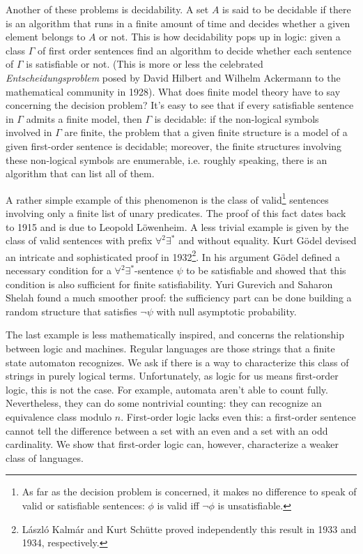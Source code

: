 Another of these problems is decidability. 
A set $A$ is said to be decidable if there is an algorithm that runs in a finite amount of time and decides whether a given element belongs to $A$ or not. 
This is how decidability pops up in logic: given a class $\Gamma$ of first order sentences find an algorithm to decide whether each sentence of $\Gamma$ is satisfiable or not. 
(This is more or less the celebrated \emph{Entscheidungsproblem} posed by David Hilbert and Wilhelm Ackermann to the mathematical community in 1928). 
What does finite model theory have to say concerning the decision problem? 
It's easy to see that if every satisfiable sentence in $\Gamma$ admits a finite model, then $\Gamma$ is decidable: if the non-logical symbols involved in $\Gamma$ are finite, the problem that a given finite structure is a model of a given first-order sentence is decidable; moreover, the finite structures involving these non-logical symbols are enumerable, i.e. roughly speaking, there is an algorithm that can list all of them. 

A rather simple example of this phenomenon is the class of valid\footnote{As far as the decision problem is concerned, it makes no difference to speak of valid or satisfiable sentences: $\phi$ is valid iff $\lnot \phi$ is unsatisfiable.} 
sentences involving only a finite list of unary predicates. The proof of this fact dates back to 1915 and is due to Leopold L\"owenheim. 
A less trivial example is given by the class of valid sentences with prefix $\forall^2 \exists^{\ast}$ and without equality. 
Kurt G\"odel devised an intricate and sophisticated proof in 1932\footnote{L\'aszl\'o Kalm\'ar and Kurt Sch\"utte proved independently this result in 1933 and 1934, respectively.}. 
In his argument G\"odel defined a necessary condition for a $\forall^2 \exists^{\ast}$-sentence $\psi$ to be satisfiable and showed that this condition is also sufficient for finite satisfiability. 
Yuri Gurevich and Saharon Shelah \cite{shelah} found a much smoother proof: the sufficiency part can be done building a random structure that satisfies $\lnot \psi$ with null asymptotic probability. 

The last example is less mathematically inspired, and concerns the relationship between logic and machines. 
Regular languages are those strings that a finite state automaton recognizes. 
We ask if there is a way to characterize this class of strings in purely logical terms. 
Unfortunately, as logic for us means first-order logic, this is not the case. 
For example, automata aren't able to count fully. 
Nevertheless, they can do some nontrivial counting: they can recognize an equivalence class modulo $n$. 
First-order logic lacks even this: a first-order sentence cannot tell the difference between a set with an even and a set with an odd cardinality. 
We show that first-order logic can, however, characterize a weaker class of languages. 
